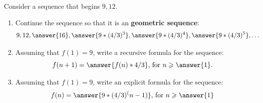 \documentclass[nooutcomes]{ximera}
\begin{document}
\begin{problem}
Consider a sequence that begins $9, 12$.    
\begin{enumerate}
\item Continue the sequence so that it is an \textbf{geometric sequence}:
\[
9, 12, \answer{16}, \answer{9*(4/3)^3}, \answer{9*(4/3)^4}, \answer{9*(4/3)^5}, \dots
\]
\item Assuming that $f(1)=9$, write a recursive formula for the sequence:
\[
f(n+1)=\answer{f(n)*4/3}\textrm{, for }n\ge\answer{1}.
\]
\item Assuming that $f(1)=9$, write an explicit formula for the sequence: 
\[
f(n)=\answer{9*(4/3)^(n-1)}\textrm{, for }n\ge\answer{1}
\]
\end{enumerate}
\end{problem}
\end{document}
